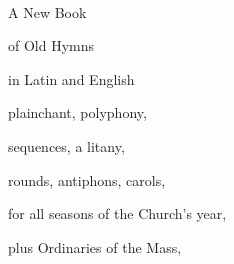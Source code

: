 
\hoffset-5mm
\voffset-10mm









%





\nopagenumbers



\

\bigskip

\bigskip

\centerline{\Bigtype A New Book}

\bigskip

\centerline{\Bigtype of Old Hymns}

\bigskip

\bigskip

\centerline{\bigtype in Latin and English}

\bigskip




\bigskip

\centerline{plainchant, polyphony,}

\bigskip

\centerline{sequences, a litany,}

\bigskip

\centerline{rounds, antiphons, carols,}

\bigskip

\centerline{for all seasons of the Church's year,}

\bigskip

\centerline{plus Ordinaries of the Mass,}

\bigskip

